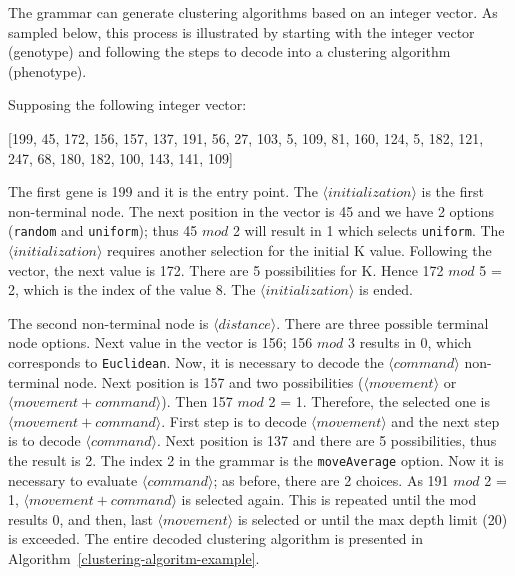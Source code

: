 \documentclass[conference]{IEEEtran}
\begin{document}
	
	The grammar can generate clustering algorithms based on an integer vector. As sampled below, this process is illustrated by starting with the integer vector (genotype) and following the steps to decode into a clustering algorithm (phenotype). 
	
	Supposing the following integer vector:
	
	\vspace{0.2cm}
	
	[199, 45, 172, 156, 157, 137, 191, 56, 27, 103, 5, 109, 81, 160, 124, 5, 182, 121, 247, 68, 180, 182, 100, 143, 141, 109]
	
	\vspace{0.2cm}
	
	The first gene is 199 and it is the entry point. The $\langle initialization \rangle$ is the first non-terminal node. The next position in the vector is 45 and we have 2 options (\texttt{random} and \texttt{uniform}); thus 45 $mod$ 2 will result in 1 which selects \texttt{uniform}. The $\langle initialization \rangle$ requires another selection for the initial K value. Following the vector, the next value is 172. There are 5 possibilities for K. Hence 172 $mod$ 5 = 2, which is the index of the value 8. The $\langle initialization \rangle$ is ended.
	
	The second non-terminal node is $\langle distance \rangle$. There are three possible terminal node options. Next value in the vector is 156; 156 $mod$ 3 results in 0, which corresponds to \texttt{Euclidean}. Now, it is necessary to decode the $\langle command \rangle$ non-terminal node. Next position is 157 and two possibilities ($\langle movement \rangle$ or $\langle movement + command \rangle$). Then 157 $mod$ 2 = 1. Therefore, the selected one is $\langle movement + command \rangle$. First step is to decode $\langle movement\rangle$ and the next step is to decode  $\langle command \rangle$. Next position is 137 and there are 5 possibilities, thus the result is 2. The index 2 in the grammar is the \texttt{moveAverage} option. Now it is necessary to evaluate $\langle command \rangle$; as before, there are 2 choices. As 191 $mod$ 2 = 1, $\langle movement + command \rangle$ is selected again. This is repeated until the mod results 0,  and then, last $\langle movement \rangle$ is selected or until the max depth limit (20) is exceeded. The entire decoded clustering algorithm is presented in Algorithm~\ref{clustering-algoritm-example}.
	
\end{document}
